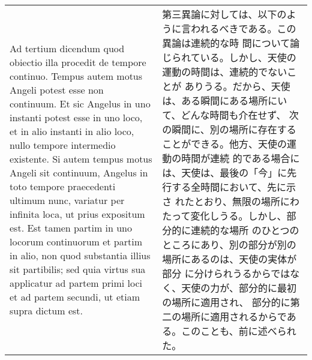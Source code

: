 \documentclass[10pt]{jsarticle} %
\begin{document}
\begin{longtable}{p{21em}p{21em}}
\\


{\sc Ad tertium dicendum} quod obiectio illa
procedit de tempore continuo. Tempus autem motus Angeli potest esse non
continuum. Et sic Angelus in uno instanti potest esse in uno loco, et in
alio instanti in alio loco, nullo tempore intermedio existente. Si autem
tempus motus Angeli sit continuum, Angelus in toto tempore praecedenti
ultimum nunc, variatur per infinita loca, ut prius expositum est. Est
tamen partim in uno locorum continuorum et partim in alio, non quod
substantia illius sit partibilis; sed quia virtus sua applicatur ad
partem primi loci et ad partem secundi, ut etiam supra dictum est.

&

第三異論に対しては、以下のように言われるべきである。この異論は連続的な時
間について論じられている。しかし、天使の運動の時間は、連続的でないことが
ありうる。だから、天使は、ある瞬間にある場所にいて、どんな時間も介在せず、
次の瞬間に、別の場所に存在することができる。他方、天使の運動の時間が連続
的である場合には、天使は、最後の「今」に先行する全時間において、先に示さ
れたとおり、無限の場所にわたって変化しうる。しかし、部分的に連続的な場所
 のひとつのところにあり、別の部分が別の場所にあるのは、天使の実体が部分
 に分けられうるからではなく、天使の力が、部分的に最初の場所に適用され、
 部分的に第二の場所に適用されるからである。このことも、前に述べられた。


\end{longtable}
\end{document}
